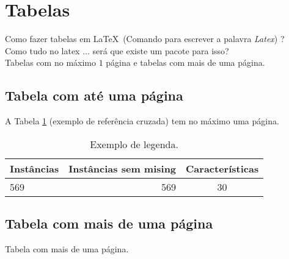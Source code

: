 \documentclass[12pt, a4paper]{article}
\begin{document}
\section{Tabelas}
Como fazer tabelas em \LaTeX\ (Comando para escrever a palavra \emph{Latex}) ?										\\
Como tudo no latex $\ldots$ será que existe um pacote para isso? 		\\
Tabelas com no máximo $1$ página e tabelas com mais de uma página. 	

\newpage
\subsection{Tabela com até uma página}
A Tabela \ref{ROTULO_01} (exemplo de referência cruzada) tem no máximo uma página.

\begin{table}[h]

\center

\begin{tabular}{|l|r|c|}

 \hline

 \textbf{Instâncias} & \textbf{Instâncias sem mising}  & \textbf{Características} \\ \hline
 
 569 & 569 & 30    \\ \hline

\end{tabular}

\caption{Exemplo de legenda.}

\label{ROTULO_01}

\end{table}

\newpage
\subsection{Tabela com mais de uma página}
Tabela com mais de uma página.
\end{document}
